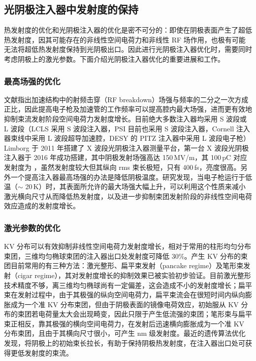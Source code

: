 \subsection{光阴极注入器中发射度的保持}
热发射度的优化和光阴极注入器的优化是密不可分的：即使在阴极表面产生了超低热发射度，因其可能存在的非线性空间电荷力和非线性 RF 场作用，也极有可能无法将超低热发射度保持到光阴极出口。因此进行光阴极注入器优化时，需要同时考虑阴极上的激光参数。下面介绍光阴极注入器优化的重要进展和工作。

\subsubsection{最高场强的优化}
文献\cite{wang1997field}指出加速结构中的射频击穿（RF breakdown）场强与频率的二分之一次方成正比，因此提高电子枪及加速管的工作频率可以提高腔内最大场强，进而更有效地抑制束流发射阶段空间电荷力发射度增长。目前绝大多数注入器均采用 S 波段或 L 波段（LCLS 采用 S 波段注入器\cite{Zhou:2015aa}，PSI 目前也采用 S 波段注入器\cite{prat2014emittance}，Cornell 注入器束线中采用 L 波段超导加速腔\cite{shemelin2012frequency,Bartnik:2015aa}，DESY 的 PITZ 注入器中采用 L 波段电子枪\cite{Krasilnikov:2012aa}）Limborg 于 2011 年搭建了 X 波段光阴极注入器测量平台\cite{Limborg-Deprey:2011aa}，第一台 X 波段光阴极注入器于 2016 年成功搭建\cite{Limborg-Deprey:2016aa}，其中阴极发射场强高达 150\,MV/m，其 100\,pC 对应发射度为 ，虽然发射度较大但其纵向 rms 束长极短，只有 400\,fs，亮度很高。另外一个提高注入器最高场强的办法是降低阴极温度。研究发现，当电子枪运行于低温（$\sim$ 20\,K）时，其表面所允许的最大场强大幅上升\cite{Rosenzweig:2016aa}，可以利用这个性质来减小激光横向尺寸从而降低热发射度，以及进一步抑制束团发射阶段的非线性空间电荷效应造成的发射度增长。

\subsubsection{激光参数的优化}
KV 分布\cite{Kapchinskij:1959aa}可以有效抑制非线性空间电荷力发射度增长\cite{Limborg-Deprey:2006aa,Khojoyan:2013aa}，相对于常用的柱形均匀分布束团，三维均匀椭球束团的注入器出口处发射度可降低 30\%\cite{Khojoyan:2014aa}。产生 KV 分布的束团目前常用的有三种方法：激光整形、扁平束发射（pancake regime）及笔形束发射（cigar regime），其对发射度增长的抑制效果已被实验初步验证\cite{Khojoyan:2013aa,Khojoyan:2014aa,Musumeci:2008ab,Li:2012aa}。目前激光整形技术精度不够，离三维均匀椭球尚有一定偏差，这会造成不小的发射度增长\cite{Khojoyan:2013aa}；扁平束在发射过程中，由于其极强的纵向空间电荷力，扁平束流会在很短时间内纵向膨胀成为一个准 KV 分布束团，但由于阴极表面的镜像电荷效应，初始服从 KV 分布的束团若电荷量太大会出现畸变，因此只限于产生低流强的束团\cite{Musumeci:2008ab}；笔形束与扁平束正相反，靠其极强的横向空间电荷力，在发射后迅速横向膨胀成为一个准 KV 分布束团，且由于其横向尺寸很小，可产生 nm 级发射度\cite{Li:2012aa}。最近的遗传算法优化发现，将阴极上的初始束长拉长，有助于保持阴极热发射度，在注入器出口处可获得更低发射度的束流\cite{Qian:2016aa}。

